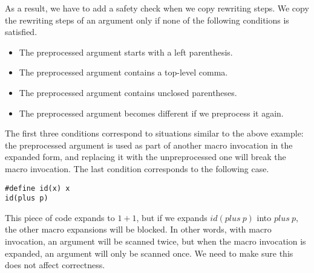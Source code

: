 As a result, we have to add a safety check when we copy rewriting
steps. We copy the rewriting
steps of an argument only if none of the following conditions is satisfied.
\begin{itemize}
\item The preprocessed argument starts with a left parenthesis.
\item The preprocessed argument contains a top-level comma.
\item The preprocessed argument contains unclosed parentheses.
\item The preprocessed argument becomes different if we preprocess it
  again.
\end{itemize}
The first three conditions correspond to situations similar to the
above example: the preprocessed argument is used as part of another
macro invocation in the expanded form, and replacing it with the
unpreprocessed one will break the macro invocation.  
The last condition corresponds to the following case.
\begin{lstlisting}
#define id(x) x
id(plus p)
\end{lstlisting}
This piece of code expands to $1+1$, but if we expands $id(plus\ p)$
into $plus\ p$, the other macro expansions will be blocked. In other words, with macro
invocation, an argument will be scanned twice, but when the macro
invocation is expanded, an argument will only be scanned once. We need
to make sure this does not affect correctness.

